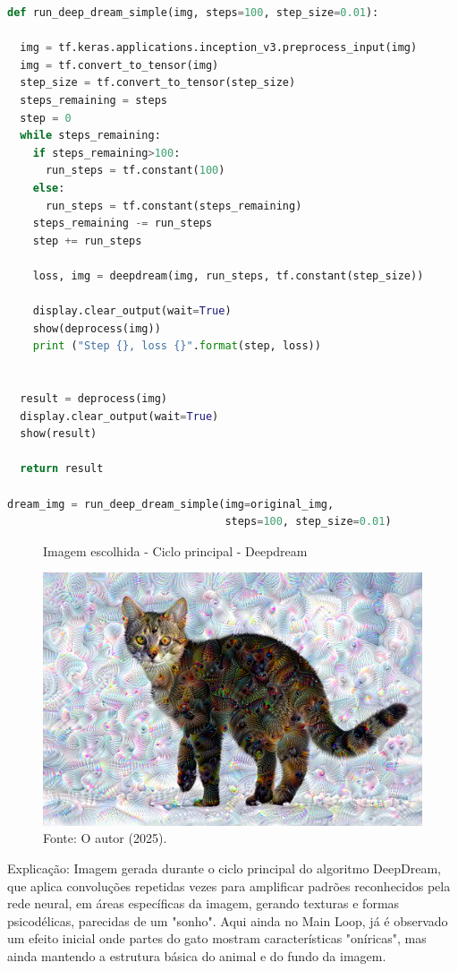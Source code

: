 \begin{lstlisting}[language=Python, style=input]
def run_deep_dream_simple(img, steps=100, step_size=0.01):

  img = tf.keras.applications.inception_v3.preprocess_input(img)
  img = tf.convert_to_tensor(img)
  step_size = tf.convert_to_tensor(step_size)
  steps_remaining = steps
  step = 0
  while steps_remaining:
    if steps_remaining>100:
      run_steps = tf.constant(100)
    else:
      run_steps = tf.constant(steps_remaining)
    steps_remaining -= run_steps
    step += run_steps

    loss, img = deepdream(img, run_steps, tf.constant(step_size))

    display.clear_output(wait=True)
    show(deprocess(img))
    print ("Step {}, loss {}".format(step, loss))


  result = deprocess(img)
  display.clear_output(wait=True)
  show(result)

  return result

dream_img = run_deep_dream_simple(img=original_img,
                                  steps=100, step_size=0.01)
\end{lstlisting}
\begin{figure}[H]
\centering
\caption{Imagem escolhida - Ciclo principal - Deepdream}
\includegraphics[width=.8\linewidth]{apendices/fig/13_IAA012_12.png}
\caption*{Fonte: O autor (2025).}
\end{figure}
Explicação: Imagem gerada durante o ciclo principal do algoritmo DeepDream, que aplica convoluções repetidas vezes para amplificar padrões reconhecidos pela rede neural, em áreas específicas da imagem, gerando texturas e formas psicodélicas, parecidas de um "sonho". Aqui ainda no Main Loop, já é observado um efeito inicial onde partes do gato mostram características "oníricas", mas ainda mantendo a estrutura básica do animal e do fundo da imagem.

